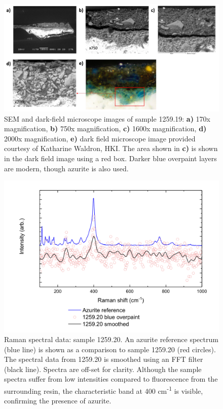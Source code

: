 \begin{figure}[H]
  \centering
  \includegraphics[width=\linewidth]{1259-20_imgs}
\caption[SEM and dark-field microscope images of sample 1259.19.]{SEM and dark-field microscope images of sample 1259.19: \textbf{a)} 170x magnification, \textbf{b)} 750x magnification, \textbf{c)} 1600x magnification, \textbf{d)} 2000x magnification, \textbf{e)} dark field microscope image provided courtesy of Katharine Waldron, HKI. The area shown in \textbf{c)} is shown in the dark field image using a red box. Darker blue overpaint layers are modern, though azurite is also used.}
\label{fig:1259.20_imgs}
\end{figure}

\begin{figure}[H] 
\centering
  \includegraphics[width=0.8\linewidth]{1259-20_blue_overpaint}
\caption[Raman spectral data, 1259.20]{Raman spectral data: sample 1259.20. An azurite reference spectrum (blue line) is shown as a comparison to sample 1259.20 (red circles). The spectral data from 1259.20 is smoothed using an FFT filter (black line). Spectra are off-set for clarity. Although the sample spectra suffer from low intensities compared to fluorescence from the surrounding resin, the characteristic band at 400 cm\textsuperscript{-1} is visible, confirming the presence of azurite.}
\label{fig:raman_1259-20}
\end{figure}

